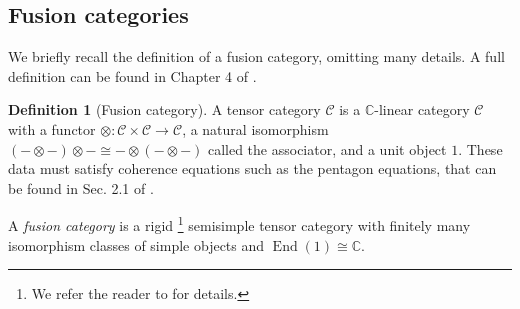 \documentclass[aps,prb,twocolumn,superscriptaddress,noshowkeys]{revtex4-2}  %
\DeclareMathOperator{\End}{End}
\newcommand{\cat}{\mathcal{C}}
\theoremstyle{plain}%
\theoremstyle{definition}
\newtheorem{definition}{Definition}[section]
\theoremstyle{remark}
\begin{document}

\subsection{Fusion categories}

We briefly recall the definition of a fusion category, omitting many details. A full definition can be found in Chapter 4 of \cite{Etingof2015}.
\begin{definition}[Fusion category]
	A tensor category $\cat$ is a $\mathbb{C}$-linear category $\cat$ with a functor $\otimes:\cat\times\cat\to\cat$, a natural isomorphism $(-\otimes-)\otimes-\cong-\otimes(-\otimes-)$ called the associator, and a unit object $1$.
	These data must satisfy coherence equations such as the pentagon equations, that can be found in Sec. 2.1 of \cite{Etingof2015}.
	
	A \emph{fusion category} is a rigid \footnote{We refer the reader to \cite{Etingof2015} for details.} semisimple tensor category with finitely many isomorphism classes of simple objects and $\End(1)\cong \mathbb{C}$.
	

\end{definition}
\end{document}
